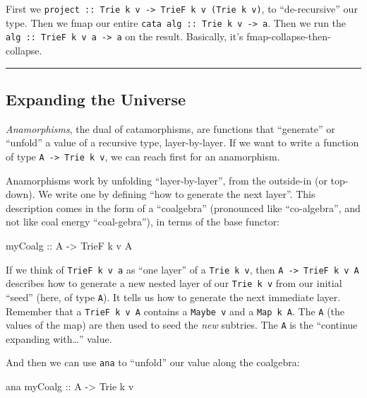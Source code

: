 \documentclass[]{article}
\newenvironment{Shaded}{}{}
\newcommand{\DataTypeTok}[1]{\textcolor[rgb]{0.56,0.13,0.00}{#1}}
\newcommand{\NormalTok}[1]{#1}
\newcommand{\OtherTok}[1]{\textcolor[rgb]{0.00,0.44,0.13}{#1}}
\begin{document}
First we
\texttt{project\ ::\ Trie\ k\ v\ -\textgreater{}\ TrieF\ k\ v\ (Trie\ k\ v)}, to
``de-recursive'' our type. Then we fmap our entire
\texttt{cata\ alg\ ::\ Trie\ k\ v\ -\textgreater{}\ a}. Then we run the
\texttt{alg\ ::\ TrieF\ k\ v\ a\ -\textgreater{}\ a} on the result. Basically,
it's fmap-collapse-then-collapse.

\begin{center}\rule{0.5\linewidth}{\linethickness}\end{center}

\hypertarget{expanding-the-universe}{%
\subsection{Expanding the Universe}\label{expanding-the-universe}}

\emph{Anamorphisms}, the dual of catamorphisms, are functions that ``generate''
or ``unfold'' a value of a recursive type, layer-by-layer. If we want to write a
function of type \texttt{A\ -\textgreater{}\ Trie\ k\ v}, we can reach first for
an anamorphism.

Anamorphisms work by unfolding ``layer-by-layer'', from the outside-in (or
top-down). We write one by defining ``how to generate the next layer''. This
description comes in the form of a ``coalgebra'' (pronounced like
``co-algebra'', and not like coal energy ``coal-gebra''), in terms of the base
functor:

\begin{Shaded}
\begin{Highlighting}[]
\OtherTok{myCoalg ::} \DataTypeTok{A} \OtherTok{->} \DataTypeTok{TrieF}\NormalTok{ k v }\DataTypeTok{A}
\end{Highlighting}
\end{Shaded}

If we think of \texttt{TrieF\ k\ v\ a} as ``one layer'' of a
\texttt{Trie\ k\ v}, then \texttt{A\ -\textgreater{}\ TrieF\ k\ v\ A} describes
how to generate a new nested layer of our \texttt{Trie\ k\ v} from our initial
``seed'' (here, of type \texttt{A}). It tells us how to generate the next
immediate layer. Remember that a \texttt{TrieF\ k\ v\ A} contains a
\texttt{Maybe\ v} and a \texttt{Map\ k\ A}. The \texttt{A} (the values of the
map) are then used to seed the \emph{new} subtries. The \texttt{A} is the
``continue expanding with\ldots{}'' value.

And then we can use \texttt{ana} to ``unfold'' our value along the coalgebra:

\begin{Shaded}
\begin{Highlighting}[]
\NormalTok{ana}\OtherTok{ myCoalg ::} \DataTypeTok{A} \OtherTok{->} \DataTypeTok{Trie}\NormalTok{ k v}
\end{Highlighting}
\end{Shaded}
\end{document}
